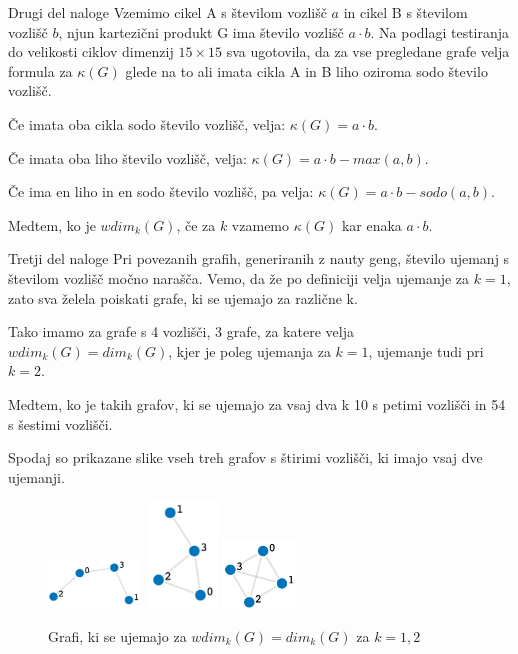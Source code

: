 \documentclass[12pt,a4paper]{amsart}
\makeatletter
\renewcommand\subsection{\@startsection{subsection}{2}%
  \z@{.5\linespacing\@plus.7\linespacing}{.5\linespacing}%
  {\normalfont\scshape}}
\theoremstyle{plain} %
\makeatother
\begin{document}
    
\subsection{Drugi del naloge}
Vzemimo cikel A s številom vozlišč $a$ in cikel B s številom vozlišč $b$, njun kartezični produkt G ima število vozlišč $a \cdot b$. 
Na podlagi testiranja do velikosti ciklov dimenzij $15 \times 15 $ sva ugotovila, da za vse pregledane grafe velja formula za $\kappa(G)$ glede na to ali imata cikla A in B liho oziroma sodo število vozlišč. 

Če imata oba cikla sodo število vozlišč, velja: $\kappa(G) = a \cdot b$.

Če imata oba liho število vozlišč, velja: $\kappa(G) = a \cdot b - max(a,b)$.

Če ima en liho in en sodo število vozlišč, pa velja: $\kappa(G) = a \cdot b - sodo(a,b)$.

Medtem, ko je $wdim_k(G)$, če za $k$ vzamemo $\kappa(G)$ kar enaka $a \cdot b$.


\bigskip
\subsection{Tretji del naloge}
Pri povezanih grafih, generiranih z nauty geng, število ujemanj s številom vozlišč močno narašča. 
Vemo, da že po definiciji velja ujemanje za $k = 1$, zato sva želela poiskati grafe, ki se ujemajo za različne k.

Tako imamo za grafe s 4 vozlišči, 3 grafe, za katere velja $wdim_k(G) = dim_k(G)$, kjer je poleg ujemanja za $k = 1$, 
ujemanje tudi pri $k = 2$.

Medtem, ko je takih grafov, ki se ujemajo za vsaj dva k 10 s petimi vozlišči in 54 s šestimi vozlišči. 

\bigskip

Spodaj so prikazane slike vseh treh grafov s štirimi vozlišči, ki imajo vsaj dve ujemanji.

\bigskip
\begin{figure}[h]
    \centering
    \includegraphics[width=0.22\textwidth]{slike/naloga3_12.png}
    \includegraphics[width=0.17\textwidth]{slike/naloga3_23.png}
    \includegraphics[width=0.17\textwidth]{slike/naloga3_34.png}
    \caption{Grafi, ki se ujemajo za $wdim_k(G)=dim_k(G)$ za $k = 1,2$}
    \label{fig:slika1}
\end{figure}
\end{document}
